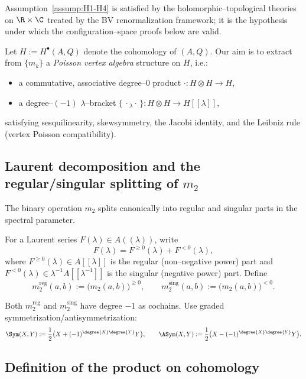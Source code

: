 \begin{remark}
Assumption~\ref{assump:H1-H4} is satisfied by the holomorphic--topological theories on $\R\times\C$ treated by the BV renormalization framework; it is the hypothesis under which the configuration--space proofs below are valid.
\end{remark}

Let $H:=H^\bullet(A,Q)$ denote the cohomology of $(A,Q)$. Our aim is to extract from $\{m_k\}$ a \emph{Poisson vertex algebra} structure on $H$, i.e.:
\begin{itemize}[leftmargin=2em]
 \item a commutative, associative degree–$0$ product $\cdot\colon H\otimes H\to H$,
 \item a degree–$(-1)$ $\lambda$–bracket $\{\,\cdot {}_\lambda \cdot\,\}\colon H\otimes H\to H[\![\lambda]\!]$,
\end{itemize}
satisfying sesquilinearity, skewsymmetry, the Jacobi identity, and the Leibniz rule (vertex Poisson compatibility).

\subsection{Laurent decomposition and the regular/singular splitting of $m_2$}

The binary operation $m_2$ splits canonically into regular and singular parts in the spectral parameter.

\begin{definition}
For a Laurent series $F(\lambda)\in A((\lambda))$, write
\[
F(\lambda) = F^{\ge0}(\lambda) + F^{<0}(\lambda),
\]
where $F^{\ge0}(\lambda)\in A[\![\lambda]\!]$ is the regular (non–negative power) part and $F^{<0}(\lambda)\in \lambda^{-1}A[\![\lambda^{-1}]\!]$ is the singular (negative power) part. Define
\[
m_2^{\mathrm{reg}}(a,b) := \Big(m_2(a,b)\Big)^{\ge0},
\qquad
m_2^{\mathrm{sing}}(a,b) := \Big(m_2(a,b)\Big)^{<0}.
\]
\end{definition}

Both $m_2^{\mathrm{reg}}$ and $m_2^{\mathrm{sing}}$ have degree $-1$ as cochains. Use graded symmetrization/antisymmetrization:
\[
\Sym(X,Y):=\frac12\big( X + (-1)^{\degree{X}\degree{Y}}Y\big),
\qquad
\ASym(X,Y):=\frac12\big( X - (-1)^{\degree{X}\degree{Y}}Y\big).
\]

\subsection{Definition of the product on cohomology}

